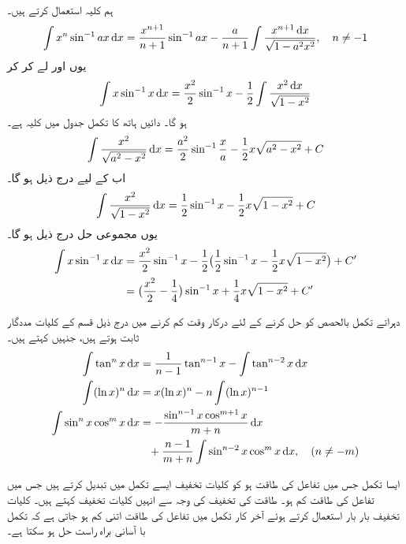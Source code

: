 ہم کلیہ  استعمال کرتے ہیں۔
\begin{align*}
\int x^n\sin^{-1}ax\dif x=\frac{x^{n+1}}{n+1}\sin^{-1}ax-\frac{a}{n+1}\int\frac{x^{n+1}\dif x}{\sqrt{1-a^2x^2}},\quad n\ne -1
\end{align*}
یوں  اور  لے کر کر
\begin{align*}
\int x\sin^{-1}x\dif x=\frac{x^2}{2}\sin^{-1}x-\frac{1}{2}\int\frac{x^2\dif x}{\sqrt{1-x^2}}
\end{align*}
ہو گا۔ دائیں ہاتھ کا  تکمل جدول میں کلیہ  ہے۔
\begin{align*}
\int \frac{x^2}{\sqrt{a^2-x^2}}\dif x=\frac{a^2}{2}\sin^{-1}\frac{x}{a}-\frac{1}{2}x\sqrt{a^2-x^2}+C
\end{align*}
اب  کے لیے درج ذیل ہو گا۔
\begin{align*}
\int \frac{x^2}{\sqrt{1-x^2}}\dif x=\frac{1}{2}\sin^{-1}x-\frac{1}{2}x\sqrt{1-x^2}+C
\end{align*}
یوں مجموعی حل درج ذیل ہو گا۔
\begin{align*}
\int x\sin^{-1}x\dif x&=\frac{x^2}{2}\sin^{-1}x-\frac{1}{2}\big(\frac{1}{2}\sin^{-1}x-\frac{1}{2}x\sqrt{1-x^2}\big)+C'\\
&=\big(\frac{x^2}{2}-\frac{1}{4}\big)\sin^{-1}x+\frac{1}{4}x\sqrt{1-x^2}+C'
\end{align*}


دہراتے  تکمل بالحصص کو حل کرنے کے لئے درکار وقت کم کرنے میں   درج ذیل قسم  کے کلیات مددگار ثابت ہوتے ہیں،  جنہیں  کہتے ہیں۔
\begin{align}
\int \tan^n x\dif x&=\frac{1}{n-1}\tan^{n-1}x-\int \tan^{n-2}x\dif x\label{مساوات_طریقہ_کلیات_تخفیف_الف}\\
\int(\ln x)^n\dif x&=x(\ln x)^n-n\int(\ln x)^{n-1}\label{مساوات_طریقہ_کلیات_تخفیف_ب}\\
\int\sin^nx\cos^mx\dif x&=-\frac{\sin^{n-1}x\cos^{m+1}x}{m+n}\dif x\nonumber\\
&\phantom{=}+\frac{n-1}{m+n}\int\sin^{n-2}x\cos^mx\dif x,\quad (n\ne -m)\label{مساوات_طریقہ_کلیات_تخفیف_پ}
\end{align}

ایسا تکمل جس میں   تفاعل   کی طاقت    ہو  کو  کلیات تخفیف ایسے تکمل میں تبدیل کرتے ہیں جس میں تفاعل کی طاقت کم ہو۔ طاقت کی تخفیف کی وجہ سے انہیں کلیات تخفیف کہتے ہیں۔ کلیات تخفیف بار بار استعمال کرتے ہوئے آخر کار تکمل میں تفاعل کی طاقت اتنی کم ہو جاتی ہے کہ تکمل با آسانی   براہ راست حل ہو سکتا ہے۔

